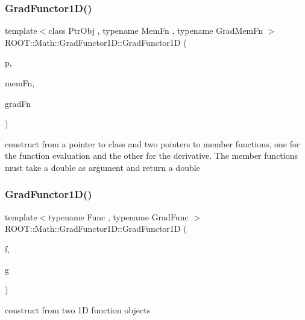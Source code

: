 \subsubsection{\texorpdfstring{GradFunctor1D()}{GradFunctor1D()}\hspace{0.1cm}{\footnotesize\ttfamily [8/10]}}
{\footnotesize\ttfamily template$<$class Ptr\+Obj , typename Mem\+Fn , typename Grad\+Mem\+Fn $>$ \\
R\+O\+O\+T\+::\+Math\+::\+Grad\+Functor1\+D\+::\+Grad\+Functor1D (\begin{DoxyParamCaption}\item[{const Ptr\+Obj \&}]{p,  }\item[{Mem\+Fn}]{mem\+Fn,  }\item[{Grad\+Mem\+Fn}]{grad\+Fn }\end{DoxyParamCaption})\hspace{0.3cm}{\ttfamily [inline]}}

construct from a pointer to class and two pointers to member functions, one for the function evaluation and the other for the derivative. The member functions must take a double as argument and return a double \mbox{\label{classROOT_1_1Math_1_1GradFunctor1D_a30baab2a961d896e4aab6e60ed30d260}} 
\subsubsection{\texorpdfstring{GradFunctor1D()}{GradFunctor1D()}\hspace{0.1cm}{\footnotesize\ttfamily [9/10]}}
{\footnotesize\ttfamily template$<$typename Func , typename Grad\+Func $>$ \\
R\+O\+O\+T\+::\+Math\+::\+Grad\+Functor1\+D\+::\+Grad\+Functor1D (\begin{DoxyParamCaption}\item[{const Func \&}]{f,  }\item[{const Grad\+Func \&}]{g }\end{DoxyParamCaption})\hspace{0.3cm}{\ttfamily [inline]}}

construct from two 1D function objects \mbox{\label{classROOT_1_1Math_1_1GradFunctor1D_ac711d3cc551b961aa16ecdcbf50308d6}} 
